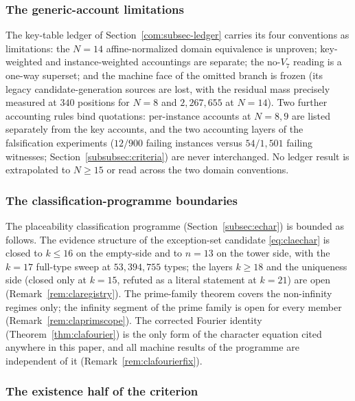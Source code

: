 \subsubsection{The generic-account limitations}\label{sta:subsubsec-genres}

The key-table ledger of Section~\ref{com:subsec-ledger} carries its four
conventions as limitations: the $N=14$ affine-normalized domain
equivalence is unproven; key-weighted and instance-weighted accountings
are separate; the no-$V_7$ reading is a one-way superset; and the
machine face of the omitted branch is frozen (its legacy
candidate-generation sources are lost, with the residual mass precisely
measured at $340$ positions for $N=8$ and $2{,}267{,}655$ at $N=14$).
Two further accounting rules bind quotations: per-instance accounts at
$N=8,9$ are listed separately from the key accounts, and the two
accounting layers of the falsification experiments ($12/900$ failing
instances versus $54/1{,}501$ failing witnesses;
Section~\ref{subsubsec:criteria}) are never interchanged. No ledger
result is extrapolated to $N\ge15$ or read across the two domain
conventions.

\subsubsection{The classification-programme boundaries}\label{sta:subsubsec-clares}

The placeability classification programme
(Section~\ref{subsec:echar}) is bounded as follows. The evidence
structure of the exception-set candidate \eqref{eq:claechar} is closed to
$k\le16$ on the empty-side and to $n=13$ on the tower side, with the
$k=17$ full-type sweep at $53{,}394{,}755$ types; the layers $k\ge18$
and the uniqueness side (closed only at $k=15$, refuted as a literal
statement at $k=21$) are open (Remark~\ref{rem:claregistry}). The
prime-family theorem covers the non-infinity regimes only; the infinity
segment of the prime family is open for every member
(Remark~\ref{rem:claprimscope}). The corrected Fourier identity
(Theorem~\ref{thm:clafourier}) is the only form of the character equation
cited anywhere in this paper, and all machine results of the programme
are independent of it (Remark~\ref{rem:clafourierfix}).

\subsubsection{The existence half of the criterion}\label{sta:subsubsec-gapex}

